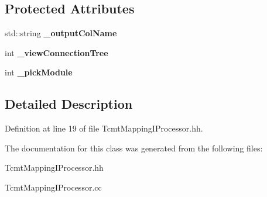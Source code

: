 \subsection*{Protected Attributes}
\begin{DoxyCompactItemize}
\item 
std::string {\bfseries \_\-outputColName}\label{classCALICE_1_1TcmtMappingIProcessor_a15cfbc83930d9bbdbfdc06e236a7ef85}

\item 
int {\bfseries \_\-viewConnectionTree}\label{classCALICE_1_1TcmtMappingIProcessor_ac01cd43e9ffa831e71f4b532f41e53ba}

\item 
int {\bfseries \_\-pickModule}\label{classCALICE_1_1TcmtMappingIProcessor_a410fc845042ea33a01a75014320c9022}

\end{DoxyCompactItemize}


\subsection{Detailed Description}


Definition at line 19 of file TcmtMappingIProcessor.hh.

The documentation for this class was generated from the following files:\begin{DoxyCompactItemize}
\item 
TcmtMappingIProcessor.hh\item 
TcmtMappingIProcessor.cc\end{DoxyCompactItemize}
